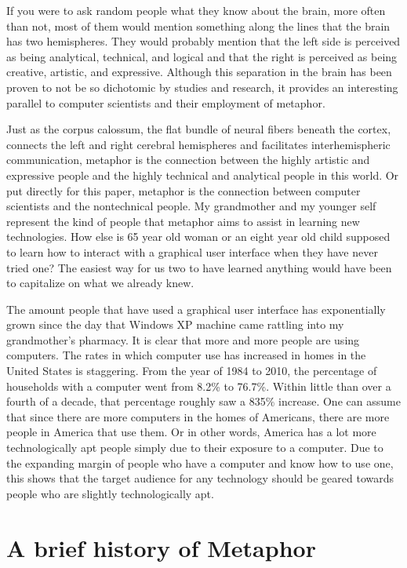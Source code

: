 \documentclass[11pt, oneside]{article}
\begin{document}
If you were to ask random people what they know about the brain, more often than not, most of them would mention something along the lines that the brain has two hemispheres. They would probably mention that the left side is perceived as being analytical, technical, and logical and that the right is perceived as being creative, artistic, and expressive. Although this separation in the brain has been proven to not be so dichotomic by studies and research, it provides an interesting parallel to computer scientists and their employment of metaphor.

Just as the corpus calossum, the flat bundle of neural fibers beneath the cortex, connects the left and right cerebral hemispheres and facilitates interhemispheric communication, metaphor is the connection between the highly artistic and expressive people and the highly  technical and analytical people in this world. Or put directly for this paper, metaphor is the connection between computer scientists and the nontechnical people. My grandmother and my younger self represent the kind of people that metaphor aims to assist in learning new technologies. How else is 65 year old woman or an eight year old child supposed to learn how to interact with a graphical user interface when they have never tried one? The easiest way for us two to have learned anything would have been to capitalize on what we already knew.

The amount people that have used a graphical user interface has exponentially grown since the day that Windows XP machine came rattling into my grandmother's pharmacy. It is clear that more and more people are using computers. The rates in which computer use has increased in homes in the United States is staggering. From the year of 1984 to 2010, the percentage of households with a computer went from 8.2\% to 76.7\%. Within little than over a fourth of a decade, that percentage roughly saw a 835\% increase. \cite{computer-use} One can assume that since there are more computers in the homes of Americans, there are more people in America that use them. Or in other words, America has a lot more technologically apt people simply due to their exposure to a computer. Due to the expanding margin of people who have a computer and know how to use one, this shows that the target audience for any technology should be geared towards people who are slightly technologically apt.

\section{A brief history of Metaphor}
\end{document}
